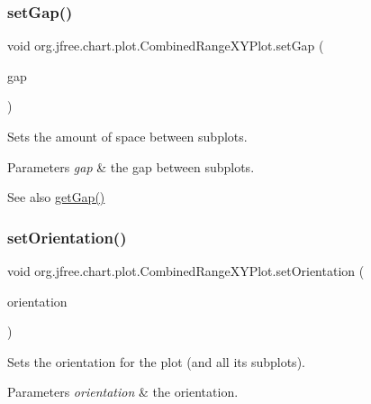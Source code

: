 \subsubsection{\texorpdfstring{set\+Gap()}{setGap()}}
{\footnotesize\ttfamily void org.\+jfree.\+chart.\+plot.\+Combined\+Range\+X\+Y\+Plot.\+set\+Gap (\begin{DoxyParamCaption}\item[{double}]{gap }\end{DoxyParamCaption})}

Sets the amount of space between subplots.


\begin{DoxyParams}{Parameters}
{\em gap} & the gap between subplots.\\
\hline
\end{DoxyParams}
\begin{DoxySeeAlso}{See also}
\mbox{\hyperlink{classorg_1_1jfree_1_1chart_1_1plot_1_1_combined_range_x_y_plot_a8a2945d6449e0f4b02327dbae7239ae3}{get\+Gap()}} 
\end{DoxySeeAlso}
\mbox{\label{classorg_1_1jfree_1_1chart_1_1plot_1_1_combined_range_x_y_plot_a77b1cc05991daefc6091dcc4b83ba0d4}} 
\subsubsection{\texorpdfstring{set\+Orientation()}{setOrientation()}}
{\footnotesize\ttfamily void org.\+jfree.\+chart.\+plot.\+Combined\+Range\+X\+Y\+Plot.\+set\+Orientation (\begin{DoxyParamCaption}\item[{\mbox{\hyperlink{classorg_1_1jfree_1_1chart_1_1plot_1_1_plot_orientation}{Plot\+Orientation}}}]{orientation }\end{DoxyParamCaption})}

Sets the orientation for the plot (and all its subplots).


\begin{DoxyParams}{Parameters}
{\em orientation} & the orientation. \\
\hline
\end{DoxyParams}
\mbox{\label{classorg_1_1jfree_1_1chart_1_1plot_1_1_combined_range_x_y_plot_ae91c0c565cc226f17b35d5dfbee8b49c}} 
